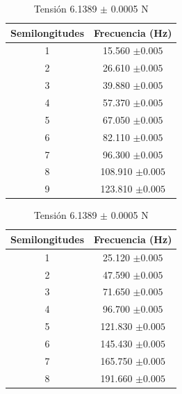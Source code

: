 \documentclass[10pt,a4paper]{article}
\begin{document}
\begin{table}[H]
    \centering
\begin{minipage}[t]{0.48\linewidth}\centering
\caption{Tensión 1.9247 $\pm$ 0.0005 N}
\begin{tabular}{ c c }
\toprule
Semilongitudes &Frecuencia (Hz)      \\
\midrule
1 & 15.560 $\pm0.005$      \\
2& 26.610 $\pm0.005$     \\
3&39.880 $\pm0.005$     \\
4&57.370 $\pm0.005$     \\
5&67.050 $\pm0.005$     \\
6&82.110 $\pm0.005$     \\
7&96.300 $\pm0.005$     \\
8&108.910 $\pm0.005$     \\
9&123.810 $\pm0.005$     \\
\bottomrule
\end{tabular}
\end{minipage}\hfill%
\begin{minipage}[t]{0.48\linewidth}\centering
\caption{Tensión 6.1389 $\pm$ 0.0005 N}
\label{tab:The parameters 2 }
\begin{tabular}{ c c }
\toprule
Semilongitudes &Frecuencia (Hz)      \\
\midrule

1 & 25.120 $\pm0.005$      \\
2& 47.590 $\pm0.005$     \\
3& 71.650 $\pm0.005$     \\
4& 96.700 $\pm0.005$     \\
5&121.830 $\pm0.005$     \\
6&145.430 $\pm0.005$     \\
7&165.750 $\pm0.005$     \\
8&191.660 $\pm0.005$     \\
\bottomrule
\end{tabular}
\end{minipage}
\end{table}
\end{document}

